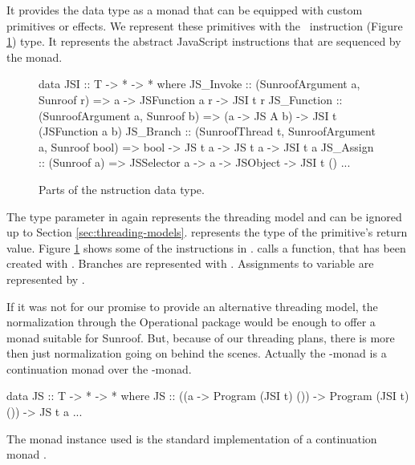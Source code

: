 It provides the  data type as a monad that
can be equipped with custom primitives or effects.
We represent these primitives with the \JSI~instruction 
(Figure \ref{fig:jsi-definition}) type. It represents the 
abstract JavaScript instructions that are sequenced by the 
monad.
\begin{figure}
\begin{Code}
data JSI :: T -> * -> * where
  JS_Invoke   :: (SunroofArgument a, Sunroof r) 
              => a -> JSFunction a r -> JSI t r
  JS_Function :: (SunroofArgument a, Sunroof b) 
              => (a -> JS A b) -> JSI t (JSFunction a b)
  JS_Branch   :: (SunroofThread t, SunroofArgument a, Sunroof bool) 
              => bool -> JS t a -> JS t a  -> JSI t a
  JS_Assign   :: (Sunroof a) 
              => JSSelector a -> a -> JSObject -> JSI t ()
  ...
\end{Code}
\caption{Parts of the \JSI nstruction data type.}
\label{fig:jsi-definition}
\end{figure}
The type parameter  in  again represents 
the threading model and can be ignored up to Section \ref{sec:threading-models}. 
 represents the type of the primitive's return value. 
Figure \ref{fig:jsi-definition} shows some of the instructions
in \JSI.
 calls a function, that has been created with .
Branches are represented with . Assignments to variable
are represented by .

If it was not for our promise to provide an alternative 
threading model, the normalization through the Operational package
would be enough to offer a monad suitable for Sunroof.
But, because of our threading plans, there is more then just 
normalization going on behind the scenes. 
Actually the \JS-monad is a continuation monad over the 
-monad.
\begin{Code}
data JS :: T -> * -> * where
  JS :: ((a -> Program (JSI t) ()) -> Program (JSI t) ()) -> JS t a
  ...
\end{Code}
The monad instance used is the standard implementation of 
a continuation monad 
\cite{Wadler:90:ComprehendingMonads,Wadler:94:MonadsComposableContinuations} 
.



